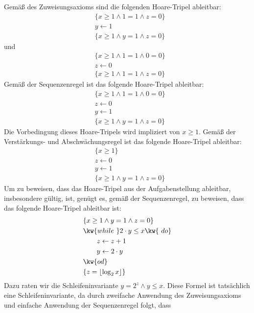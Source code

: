 \documentclass[12pt]{article}
\DeclarePairedDelimiter\floor{\lfloor}{\rfloor}
\begin{document}
\begin{loesung}
  Gemäß des Zuweisungsaxioms sind die folgenden Hoare-Tripel ableitbar:
  \begin{align*}
    & \{ x \geq 1 \land 1 = 1 \land z = 0 \} \\
    & y \gets 1 \\
    & \{ x \geq 1 \land y = 1 \land z = 0 \}
  \end{align*}
  und
  \begin{align*}
    & \{ x \geq 1 \land 1 = 1 \land 0 = 0 \} \\
    & z \gets 0 \\
    & \{ x \geq 1 \land 1 = 1 \land z = 0 \}
  \end{align*}
  Gemäß der Sequenzenregel ist das folgende Hoare-Tripel ableitbar:
  \begin{align*}
    & \{ x \geq 1 \land 1 = 1 \land 0 = 0 \} \\
    & z \gets 0 \\
    & y \gets 1 \\
    & \{ x \geq 1 \land y = 1 \land z = 0 \}
  \end{align*}
  Die Vorbedingung dieses Hoare-Tripels wird impliziert von $x \geq 1$. Gemäß der Verstärkungs- und Abschwächungsregel ist das folgende Hoare-Tripel ableitbar:
  \begin{align*}
    & \{ x \geq 1 \} \\
    & z \gets 0 \\
    & y \gets 1 \\
    & \{ x \geq 1 \land y = 1 \land z = 0 \}
  \end{align*}
  Um zu beweisen, dass das Hoare-Tripel aus der Aufgabenstellung ableitbar, insbesondere gültig, ist, genügt es, gemäß der Sequenzenregel, zu beweisen, dass das folgende Hoare-Tripel ableitbar ist:
  \begin{align*}
    & \{ x \geq 1 \land y = 1 \land z = 0 \} \\
    & \kw{while\ } 2 \cdot y \leq x \kw{\ do} \\
    & \qquad z \gets z + 1 \\
    & \qquad y \gets 2 \cdot y \\
    & \kw{od} \\
    & \{ z = \floor{\log_2 x} \}
  \end{align*}
  Dazu raten wir die Schleifeninvariante $y = 2^z \land y \leq x$. Diese Formel ist tatsächlich eine Schleifeninvariante, da durch zweifache Anwendung des Zuweisungsaxioms und einfache Anwendung der Sequenzenregel folgt, dass

\end{loesung}
\end{document}

